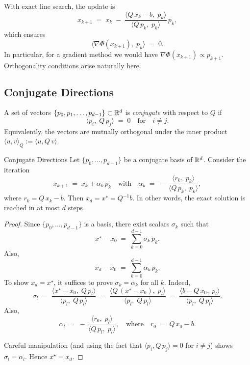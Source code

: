 With exact line search, the update is
\[
  x_{k+1}
  \;=\; x_k \;-\; \frac{\langle Q\,x_k - b,\;p_k\rangle}{\langle Q\,p_k,\;p_k\rangle}\,p_k,
\]
which ensures
\[
  \langle \nabla \Phi(x_{k+1}),\;p_k\rangle \;=\; 0.
\]
In particular, for a gradient method we would have \(\nabla \Phi(x_{k+1}) \propto p_{k+1}\). Orthogonality conditions arise naturally here.

\subsection*{Conjugate Directions}
A set of vectors \(\{p_0, p_1, \dots, p_{d-1}\}\subset \mathbb{R}^d\) is \emph{conjugate} with respect to \(Q\) if
\[
  \langle p_i,\;Q\,p_j\rangle \;=\; 0 \quad\text{for}\quad i\neq j.
\]
Equivalently, the vectors are mutually orthogonal under the inner product \(\langle u, v \rangle_Q := \langle u, Q\,v\rangle\).

\begin{lemma}{Conjugate Directions}{}
  Let \(\{p_0,\ldots,p_{d-1}\}\) be a conjugate basis of \(\mathbb{R}^d\). Consider the iteration
  \[
    x_{k+1} \;=\; x_k + \alpha_k\,p_k
    \quad\text{with}\quad
    \alpha_k \;=\; -\,\frac{\langle r_k,\;p_k\rangle}{\langle Q\,p_k,\;p_k\rangle},
  \]
  where \(r_k = Q\,x_k - b\). Then \(x_d = x^\star = Q^{-1}b\). In other words, the exact solution is reached in at most \(d\) steps.
\end{lemma}

\begin{proof}{}{}
  Since \(\{p_0,\ldots,p_{d-1}\}\) is a basis, there exist scalars \(\sigma_k\) such that
  \[
    x^\star - x_0
    \;=\; \sum_{k=0}^{d-1} \sigma_k\,p_k.
  \]
  Also,
  \[
    x_d - x_0
    \;=\; \sum_{k=0}^{d-1} \alpha_k\,p_k.
  \]
  To show \(x_d = x^\star\), it suffices to prove \(\sigma_k = \alpha_k\) for all \(k\). Indeed,
  \[
    \sigma_l
    \;=\; \frac{\langle x^\star - x_0,\;Q\,p_l\rangle}{\langle p_l,\;Q\,p_l\rangle}
    \;=\; \frac{\langle Q\,(x^\star - x_0),\;p_l\rangle}{\langle p_l,\;Q\,p_l\rangle}
    \;=\; \frac{\langle b - Q\,x_0,\;p_l\rangle}{\langle p_l,\;Q\,p_l\rangle}.
  \]
  Also,
  \[
    \alpha_l
    \;=\; -\,\frac{\langle r_0,\;p_l\rangle}{\langle Q\,p_l,\;p_l\rangle},
    \quad\text{where}\quad r_0 \;=\; Q\,x_0 - b.
  \]

  Careful manipulation (and using the fact that \(\langle p_i, Q\,p_j\rangle=0\) for \(i\neq j\)) shows \(\sigma_l = \alpha_l\). Hence \(x^\star = x_d\).

\end{proof}

